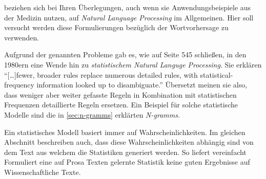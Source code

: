         \cite{jamia:introduction} beziehen sich bei Ihren Überlegungen, auch wenn sie Anwendungsbeispiele aus der Medizin nutzen, auf \emph{Natural Language Processing} im Allgemeinen. Hier soll versucht werden diese Formulierungen bezüglich der Wortvorhersage zu verwenden.
        
        Aufgrund der genannten Probleme gab es, wie \cite{jamia:introduction} auf Seite 545 schließen, in den 1980ern eine Wende hin zu \emph{statistischem Natural Languge Processing}. Sie erklären \enquote{[\dots]fewer, broader rules replace numerous detailed rules, with statistical-frequency information looked up to disambiguate.} Übersetzt meinen sie also, dass weniger aber weiter gefasste Regeln in Kombination mit statistischen Frequenzen detaillierte Regeln ersetzen. Ein Beispiel für solche statistische Modelle sind die in \autoref{sec:n-gramms} erklärten \emph{N-gramms}.
        
        Ein statistisches Modell basiert immer auf Wahrscheinlichkeiten. Im gleichen Abschnitt beschreiben \cite{jamia:introduction} auch, dass diese Wahrscheinlichkeiten abhängig sind von dem Text aus welchem die Statistiken generiert werden. So liefert vereinfacht Formuliert eine auf Prosa Texten gelernte Statistik keine guten Ergebnisse auf Wissenschaftliche Texte.
